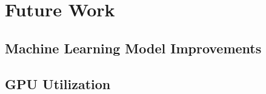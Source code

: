\chapter{Future Work}
\label{chap:ch7}

\section{Machine Learning Model Improvements}
\label{sec:ch7sec1}

\section{GPU Utilization}
\label{sec:ch7sec2}
